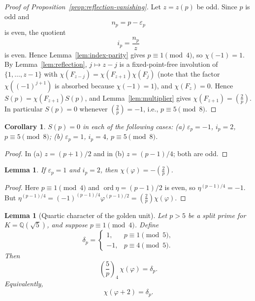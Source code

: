 \documentclass[11pt]{amsart}
\theoremstyle{plain}
\newtheorem{lemma}[theorem]{Lemma}
\newtheorem{corollary}[theorem]{Corollary}
\theoremstyle{definition}
\newcommand{\leg}[2]{\left(\frac{#1}{#2}\right)}
\newcommand{\qleg}[2]{\left(\frac{#1}{#2}\right)_{\!4}}
\begin{document}
\begin{proof}[Proof of Proposition~\ref{prop:reflection-vanishing}]
Let $z=z(p)$ be odd. Since $p$ is odd and
\[
  n_p=p-\varepsilon_p
\]
is even, the quotient
\[
  i_p=\frac{n_p}{z}
\]
is even. Hence Lemma~\ref{lem:index-parity} gives $p\equiv1\pmod4$, so
$\chi(-1)=1$. By Lemma~\ref{lem:reflection}, $j\mapsto z-j$ is a fixed-point-free
involution of $\{1,\dots,z-1\}$ with
$\chi(F_{z-j})=\chi(F_{z+1})\chi(F_j)$
(note that the factor $\chi((-1)^{j+1})$ is absorbed because $\chi(-1)=1$), and
$\chi(F_z)=0$. Hence $S(p)=\chi(F_{z+1})S(p)$, and Lemma~\ref{lem:multiplier} gives
$\chi(F_{z+1})=\leg2p$. In particular $S(p)=0$ whenever $\leg2p=-1$, i.e.,
$p\equiv5\pmod8$.
\end{proof}

\begin{corollary}\label{cor:vanishing}
$S(p)=0$ in each of the following cases: (a) $\varepsilon_p=-1$, $i_p=2$,
$p\equiv5\pmod8$; (b) $\varepsilon_p=1$, $i_p=4$, $p\equiv5\pmod8$.
\end{corollary}
\begin{proof}
In (a) $z=(p+1)/2$ and in (b) $z=(p-1)/4$; both are odd.
\end{proof}

\begin{lemma}\label{lem:split-index2-chi}
If $\varepsilon_p=1$ and $i_p=2$, then $\chi(\varphi)=-\leg2p$.
\end{lemma}
\begin{proof}
Here $p\equiv1\pmod4$ and $\operatorname{ord}\eta=(p-1)/2$ is even, so
$\eta^{(p-1)/4}=-1$. But
$\eta^{(p-1)/4}=(-1)^{(p-1)/4}\varphi^{(p-1)/2}=\leg2p\chi(\varphi)$.
\end{proof}

\begin{lemma}[Quartic character of the golden unit]\label{lem:quartic-unit}
Let $p>5$ be a split prime for $K=\mathbb Q(\sqrt5)$, and suppose
$p\equiv1\pmod4$. Define
\[
  \delta_p=
  \begin{cases}
    1,& p\equiv1\pmod5,\\
    -1,& p\equiv4\pmod5.
  \end{cases}
\]
Then
\[
  \qleg5p\,\chi(\varphi)=\delta_p.
\]
Equivalently,
\[
  \chi(\varphi+2)=\delta_p.
\]
\end{lemma}
\end{document}
